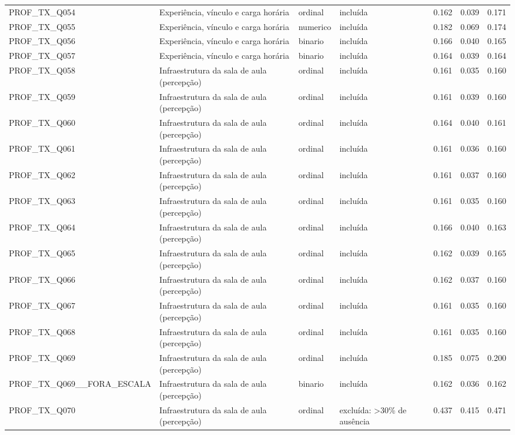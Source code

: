 \begin{tabular}{llllrrr}
PROF\_TX\_Q054 & Experiência, vínculo e carga horária & ordinal & incluída & 0.162 & 0.039 & 0.171 \\
PROF\_TX\_Q055 & Experiência, vínculo e carga horária & numerico & incluída & 0.182 & 0.069 & 0.174 \\
PROF\_TX\_Q056 & Experiência, vínculo e carga horária & binario & incluída & 0.166 & 0.040 & 0.165 \\
PROF\_TX\_Q057 & Experiência, vínculo e carga horária & binario & incluída & 0.164 & 0.039 & 0.164 \\
PROF\_TX\_Q058 & Infraestrutura da sala de aula (percepção) & ordinal & incluída & 0.161 & 0.035 & 0.160 \\
PROF\_TX\_Q059 & Infraestrutura da sala de aula (percepção) & ordinal & incluída & 0.161 & 0.039 & 0.160 \\
PROF\_TX\_Q060 & Infraestrutura da sala de aula (percepção) & ordinal & incluída & 0.164 & 0.040 & 0.161 \\
PROF\_TX\_Q061 & Infraestrutura da sala de aula (percepção) & ordinal & incluída & 0.161 & 0.036 & 0.160 \\
PROF\_TX\_Q062 & Infraestrutura da sala de aula (percepção) & ordinal & incluída & 0.161 & 0.037 & 0.160 \\
PROF\_TX\_Q063 & Infraestrutura da sala de aula (percepção) & ordinal & incluída & 0.161 & 0.035 & 0.160 \\
PROF\_TX\_Q064 & Infraestrutura da sala de aula (percepção) & ordinal & incluída & 0.166 & 0.040 & 0.163 \\
PROF\_TX\_Q065 & Infraestrutura da sala de aula (percepção) & ordinal & incluída & 0.162 & 0.039 & 0.165 \\
PROF\_TX\_Q066 & Infraestrutura da sala de aula (percepção) & ordinal & incluída & 0.162 & 0.037 & 0.160 \\
PROF\_TX\_Q067 & Infraestrutura da sala de aula (percepção) & ordinal & incluída & 0.161 & 0.035 & 0.160 \\
PROF\_TX\_Q068 & Infraestrutura da sala de aula (percepção) & ordinal & incluída & 0.161 & 0.035 & 0.160 \\
PROF\_TX\_Q069 & Infraestrutura da sala de aula (percepção) & ordinal & incluída & 0.185 & 0.075 & 0.200 \\
PROF\_TX\_Q069\_\_FORA\_ESCALA & Infraestrutura da sala de aula (percepção) & binario & incluída & 0.162 & 0.036 & 0.162 \\
PROF\_TX\_Q070 & Infraestrutura da sala de aula (percepção) & ordinal & excluída: >30\% de ausência & 0.437 & 0.415 & 0.471 \\

\end{tabular}
